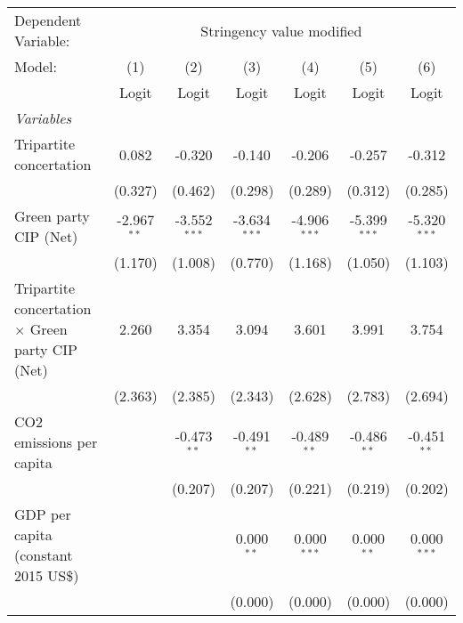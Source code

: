 
\begingroup
\centering
\begin{tabular}{lcccccc}
   \toprule
   Dependent Variable: & \multicolumn{6}{c}{Stringency value modified}\\
   Model:                                                  & (1)           & (2)            & (3)            & (4)            & (5)            & (6)\\  
                                                           &  Logit        & Logit          & Logit          & Logit          & Logit          & Logit\\  
   \midrule
   \emph{Variables}\\
   Tripartite concertation                                 & 0.082         & -0.320         & -0.140         & -0.206         & -0.257         & -0.312\\   
                                                           & (0.327)       & (0.462)        & (0.298)        & (0.289)        & (0.312)        & (0.285)\\   
   Green party CIP (Net)                                   & -2.967$^{**}$ & -3.552$^{***}$ & -3.634$^{***}$ & -4.906$^{***}$ & -5.399$^{***}$ & -5.320$^{***}$\\   
                                                           & (1.170)       & (1.008)        & (0.770)        & (1.168)        & (1.050)        & (1.103)\\   
   Tripartite concertation $\times$ Green party CIP (Net)  & 2.260         & 3.354          & 3.094          & 3.601          & 3.991          & 3.754\\   
                                                           & (2.363)       & (2.385)        & (2.343)        & (2.628)        & (2.783)        & (2.694)\\   
   CO2 emissions per capita                                &               & -0.473$^{**}$  & -0.491$^{**}$  & -0.489$^{**}$  & -0.486$^{**}$  & -0.451$^{**}$\\   
                                                           &               & (0.207)        & (0.207)        & (0.221)        & (0.219)        & (0.202)\\   
   GDP per capita (constant 2015 US\$)                     &               &                & 0.000$^{**}$   & 0.000$^{***}$  & 0.000$^{**}$   & 0.000$^{***}$\\   
                                                           &               &                & (0.000)        & (0.000)        & (0.000)        & (0.000)\\   

\end{tabular}
